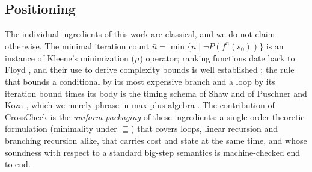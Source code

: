 \documentclass[oneside,english]{amsart}
\numberwithin{equation}{section}
\numberwithin{figure}{section}
\theoremstyle{plain}
\theoremstyle{definition}
\theoremstyle{plain}
\theoremstyle{remark}
\theoremstyle{plain}
\theoremstyle{definition}
\theoremstyle{plain}
\theoremstyle{remark}
\begin{document}
\subsection*{Positioning}
The individual ingredients of this work are classical, and we do not claim otherwise. The minimal iteration count
$\bar{n} = \min\{n \mid \neg P(f^n(s_0))\}$ is an instance of Kleene's minimization ($\mu$) operator; ranking functions
date back to Floyd \cite{floyd1967assigning}, and their use to derive complexity bounds is well established
\cite{alias2010multi,sinn2014complexity}; the rule that bounds a conditional by its most expensive
branch and a loop by its iteration bound times its body is the timing schema of Shaw and of Puschner and Koza
\cite{shaw1989reasoning,puschner1989calculating}, which we merely phrase in max-plus algebra \cite{baccelli1992synchronization}. The contribution of CrossCheck is the \emph{uniform packaging} of these
ingredients: a single order-theoretic formulation (minimality under $\sqsubseteq$) that covers loops, linear recursion
and branching recursion alike, that carries cost and state at the same time, and whose soundness with respect to a
standard big-step semantics is machine-checked end to end.
\end{document}
